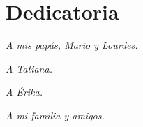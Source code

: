 
\chapter*{Dedicatoria}


\hfil \textit{A mis papás, Mario y Lourdes.} \hfil

\hfil \textit{A Tatiana.} \hfil

\hfil \textit{A Érika.} \hfil

\hfil \textit{A mi familia y amigos.} \hfil


